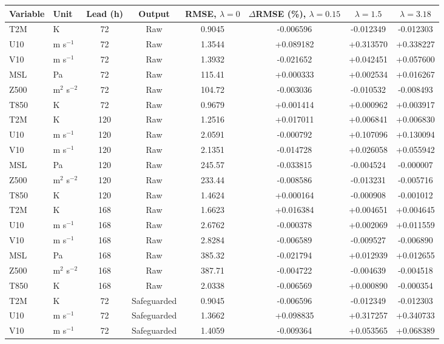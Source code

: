 \begin{tabular}{llcccccc}
\hline
Variable & Unit & Lead (h) & Output & RMSE, $\lambda=0$ & $\Delta$RMSE (\%), $\lambda=0.15$ & $\lambda=1.5$ & $\lambda=3.18$ \\
\hline
T2M & K & 72 & Raw & 0.9045 & -0.006596 & -0.012349 & -0.012303 \\
U10 & m s$^{-1}$ & 72 & Raw & 1.3544 & +0.089182 & +0.313570 & +0.338227 \\
V10 & m s$^{-1}$ & 72 & Raw & 1.3932 & -0.021652 & +0.042451 & +0.057600 \\
MSL & Pa & 72 & Raw & 115.41 & +0.000333 & +0.002534 & +0.016267 \\
Z500 & m$^2$ s$^{-2}$ & 72 & Raw & 104.72 & -0.003036 & -0.010532 & -0.008493 \\
T850 & K & 72 & Raw & 0.9679 & +0.001414 & +0.000962 & +0.003917 \\
T2M & K & 120 & Raw & 1.2516 & +0.017011 & +0.006841 & +0.006830 \\
U10 & m s$^{-1}$ & 120 & Raw & 2.0591 & -0.000792 & +0.107096 & +0.130094 \\
V10 & m s$^{-1}$ & 120 & Raw & 2.1351 & -0.014728 & +0.026058 & +0.055942 \\
MSL & Pa & 120 & Raw & 245.57 & -0.033815 & -0.004524 & -0.000007 \\
Z500 & m$^2$ s$^{-2}$ & 120 & Raw & 233.44 & -0.008586 & -0.013231 & -0.005716 \\
T850 & K & 120 & Raw & 1.4624 & +0.000164 & -0.000908 & -0.001012 \\
T2M & K & 168 & Raw & 1.6623 & +0.016384 & +0.004651 & +0.004645 \\
U10 & m s$^{-1}$ & 168 & Raw & 2.6762 & -0.000378 & +0.002069 & +0.011559 \\
V10 & m s$^{-1}$ & 168 & Raw & 2.8284 & -0.006589 & -0.009527 & -0.006890 \\
MSL & Pa & 168 & Raw & 385.32 & -0.021794 & +0.012939 & +0.012655 \\
Z500 & m$^2$ s$^{-2}$ & 168 & Raw & 387.71 & -0.004722 & -0.004639 & -0.004518 \\
T850 & K & 168 & Raw & 2.0338 & -0.006569 & +0.000890 & -0.000354 \\
T2M & K & 72 & Safeguarded & 0.9045 & -0.006596 & -0.012349 & -0.012303 \\
U10 & m s$^{-1}$ & 72 & Safeguarded & 1.3662 & +0.098835 & +0.317257 & +0.340733 \\
V10 & m s$^{-1}$ & 72 & Safeguarded & 1.4059 & -0.009364 & +0.053565 & +0.068389 \\

\end{tabular}
